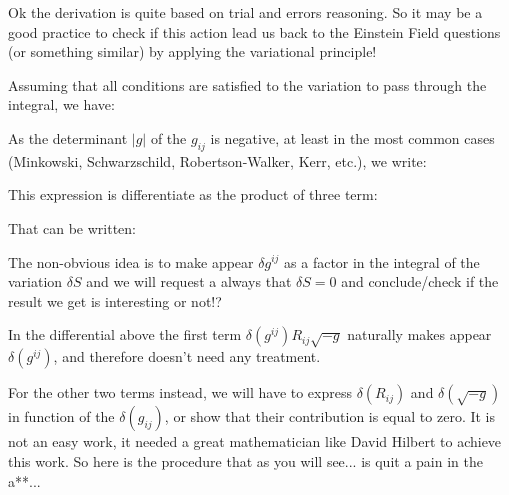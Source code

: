 	Ok the derivation is quite based on trial and errors reasoning. So it may be a good practice to check if this action lead us back to the Einstein Field questions (or something similar) by applying the variational principle!
	
	Assuming that all conditions are satisfied to the variation to pass through the integral, we have:
	
	As the determinant $|g|$ of the $g_{ij}$ is negative, at least in the most common cases (Minkowski, Schwarzschild, Robertson-Walker, Kerr, etc.), we write:
	
	This expression is differentiate as the product of three term:
	
	That can be written:
	
	The non-obvious idea is to make appear $\delta g^{ij}$ as a factor in the integral of the variation $\delta S$ and we will request a always that $\delta S=0$ and conclude/check if the result we get is interesting or not!?
	
	In the differential above the first term $\delta(g^{ij})R_{ij}\sqrt{-g}$ naturally makes appear $\delta(g^{ij})$, and therefore doesn't need any treatment.
	
	For the other two terms instead, we will have to express $\delta(R_{ij})$ and $\delta (\sqrt{-g})$ in function of the $\delta (g_{ij})$, or show that their contribution is equal to zero. It is not an easy work, it needed a great mathematician like David Hilbert to achieve this work. So here is the procedure that as you will see... is quit a pain in the a**...
	
